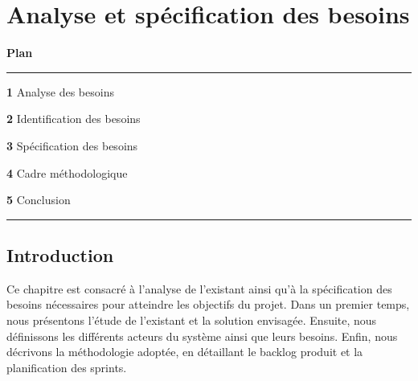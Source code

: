 ﻿\chapter{Analyse et sp\'{e}cification des besoins}
\label{chap:analyse}

\vspace{2cm}

\noindent\textbf{\Large Plan}

\vspace{0.5cm}
\noindent\rule{\textwidth}{0.4pt}
\vspace{0.3cm}

\begin{list}{}{\setlength{\leftmargin}{1.5cm}\setlength{\itemsep}{6pt}}
  \item \textbf{1} \hspace{0.3cm} Analyse des besoins \dotfill \pageref{sec:analyse}
  \item \textbf{2} \hspace{0.3cm} Identification des besoins \dotfill \pageref{sec:identification}
  \item \textbf{3} \hspace{0.3cm} Sp\'{e}cification des besoins \dotfill \pageref{sec:specification}
  \item \textbf{4} \hspace{0.3cm} Cadre m\'{e}thodologique \dotfill \pageref{sec:cadre}
  \item \textbf{5} \hspace{0.3cm} Conclusion \dotfill \pageref{sec:conclusion}
\end{list}

\vspace{0.3cm}
\noindent\rule{\textwidth}{0.4pt}

\newpage

\section*{Introduction}

Ce chapitre est consacr\'{e} \`{a} l'analyse de l'existant ainsi qu'\`{a} la sp\'{e}cification des besoins n\'{e}cessaires pour atteindre les objectifs du projet. Dans un premier temps, nous pr\'{e}sentons l'\'{e}tude de l'existant et la solution envisag\'{e}e. Ensuite, nous d\'{e}finissons les diff\'{e}rents acteurs du syst\`{e}me ainsi que leurs besoins. Enfin, nous d\'{e}crivons la m\'{e}thodologie adopt\'{e}e, en d\'{e}taillant le backlog produit et la planification des sprints.

